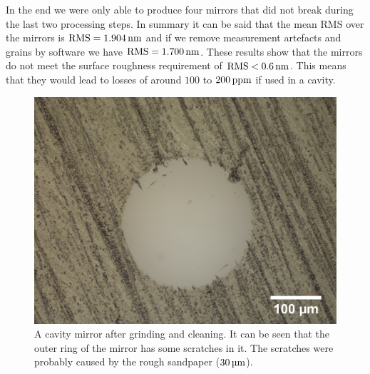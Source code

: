 In the end we were only able to produce four mirrors that did not break during the last two processing steps. In summary it can be said that the mean RMS over the mirrors is $\si{RMS}=1.904\nm$ and if we remove measurement artefacts and grains by software we have $\si{RMS}=1.700\nm$. These results show that the mirrors do not meet the surface roughness requirement of $\si{RMS}<0.6\nm$. This means that they would lead to losses of around $100$ to $200\ppm$ if used in a cavity.

\begin{figure}[H]
	\includegraphics[scale=0.19]{source/grinded_cleaned}
	\caption{A cavity mirror after grinding and cleaning. It can be seen that the outer ring of the mirror has some scratches in it. The scratches were probably caused by the rough sandpaper ($30\um$).}
\end{figure}

